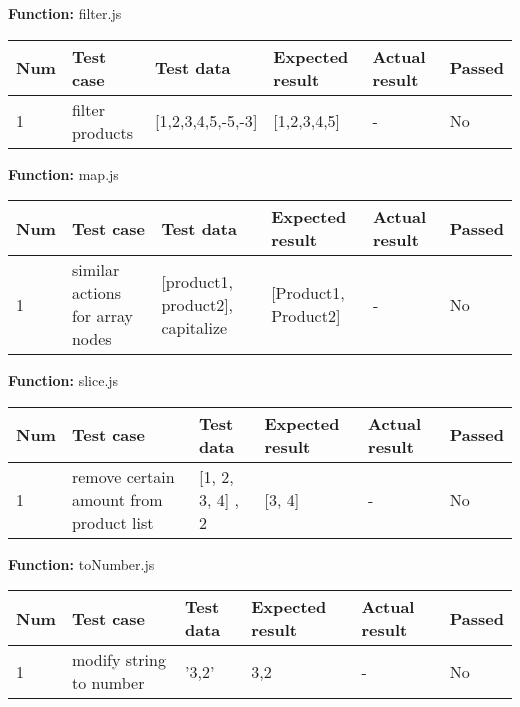 \documentclass[a4paper, 12pt]{article}
\begin{document}
        \textbf{Function:} filter.js
        
        \begin{table}[h!]
           \begin{tabular}{|l|p{3cm}|p{2cm}|p{2cm}|p{2.5cm}|l|}
                \hline
                Num & Test case        					& Test data 					& Expected result 					& Actual result 		& Passed \\ \hline
                1   & filter products 					& {[}1,2,3,4,5,-5,-3{]}     	& {[}1,2,3,4,5{]}               	& -             		& No     \\ \hline
            \end{tabular}
        \end{table}
    
        \textbf{Function:} map.js
        
        \begin{table}[h!]
           \begin{tabular}{|l|p{3cm}|p{2cm}|p{2cm}|p{2.5cm}|l|}
                \hline
                Num & Test case        					& Test data 									& Expected result 					& Actual result 		& Passed \\ \hline
                1   & similar actions for array nodes 	& {[}product1, product2{]}, capitalize     		& {[}Product1, Product2{]}          & -             		& No     \\ \hline
            \end{tabular}
        \end{table}
   \newpage 
        \textbf{Function:} slice.js
        
        \begin{table}[h!]
           \begin{tabular}{|l|p{3cm}|p{2cm}|p{2cm}|p{2.5cm}|l|}
                \hline
                Num & Test case        							& Test data 					& Expected result 					& Actual result 		& Passed \\ \hline
                1   & remove certain amount from product list 	& {[}1, 2, 3, 4{]} , 2     		& {[}3, 4{]}               			& -             		& No     \\ \hline
            \end{tabular}
        \end{table}
        
        \textbf{Function:} toNumber.js
        
        \begin{table}[h!]
           \begin{tabular}{|l|p{3cm}|p{2cm}|p{2cm}|p{2.5cm}|l|}
                \hline
                Num & Test case        					& Test data 					& Expected result 					& Actual result 		& Passed \\ \hline
                1   & modify string to number 			& '3,2'     					& 3,2               				& -             		& No     \\ \hline
            \end{tabular}
        \end{table}
    
\end{document}
